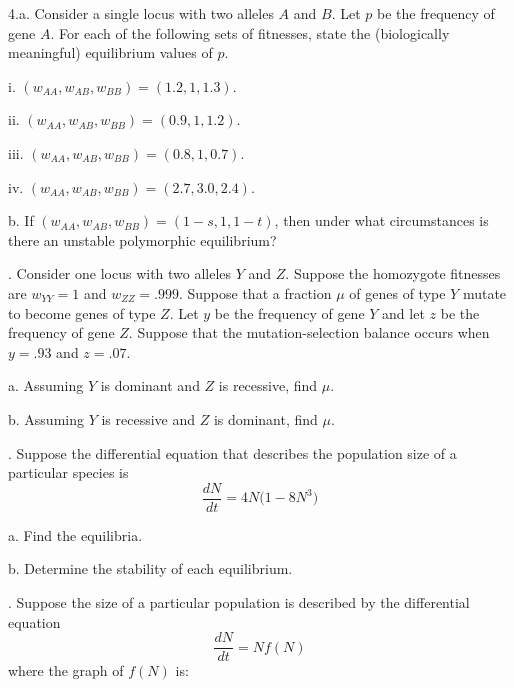 \documentclass[reqno,12pt]{amsart}
\def \dNdt{\frac{dN}{dt}}
\begin{document}
\newpage

\noindent
4.a.  Consider a single locus with two alleles $A$ and $B$.  Let
$p$ be the frequency of gene $A$.  For each of the following
sets of fitnesses, state the (biologically meaningful)
equilibrium values of $p$.

\noindent
i.  $(w_{AA},w_{AB},w_{BB}) = (1.2 , 1, 1.3)$.

\vspace{1cm}
\noindent
ii.  $(w_{AA},w_{AB},w_{BB}) = (0.9 , 1, 1.2)$.

\vspace{1cm}
\noindent
iii.  $(w_{AA},w_{AB},w_{BB}) = (0.8 , 1, 0.7)$.

\vspace{1cm}
\noindent
iv.  $(w_{AA},w_{AB},w_{BB}) = (2.7 , 3.0, 2.4)$.

\vspace{1cm}

\noindent
b.  If $(w_{AA},w_{AB},w_{BB}) = (1-s, 1, 1-t)$, then
under what circumstances is there an unstable polymorphic
equilibrium?

\vspace{2cm}

.  Consider one locus with two alleles $Y$ and $Z$.  Suppose
the homozygote fitnesses are $w_{YY} = 1$ and $w_{ZZ} = .999$.
Suppose that a fraction $\mu$ of genes of type $Y$ mutate to
become genes of type $Z$.  Let $y$ be the frequency of gene $Y$
and let $z$ be the frequency of gene $Z$.  Suppose that the
mutation-selection balance occurs when $y=.93$ and $z=.07$.

\noindent
a.  Assuming $Y$ is dominant and $Z$ is recessive, find $\mu$.

\noindent
b.  Assuming $Y$ is recessive and $Z$ is dominant, find $\mu$.

\newpage

. Suppose the differential equation that describes the population
size of a particular species is
$$
\dNdt = 4 N \bigl( 1 - 8 N^3 \bigr)
$$

\noindent
a.  Find the equilibria.

\noindent
b.  Determine the stability of each equilibrium.

\newpage

.  Suppose the size of a particular population is described by
the differential equation
$$
\dNdt = N f(N)
$$
where the graph of $f(N)$ is:

\vspace{6cm}
\end{document}
